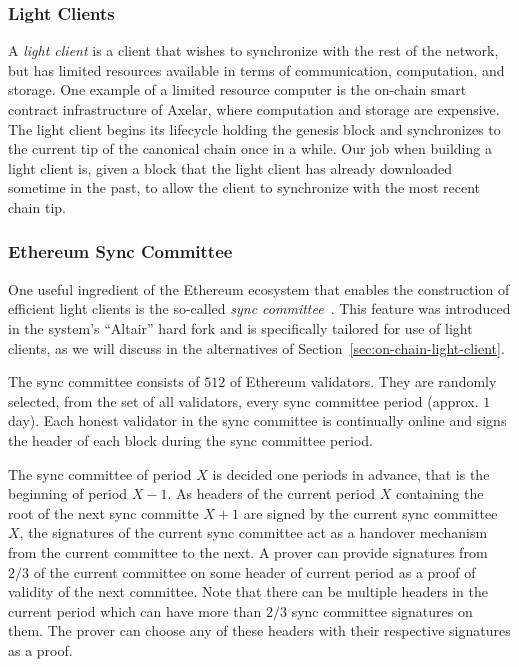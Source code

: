 \subsubsection{Light Clients}

A \emph{light client} is a client that wishes to synchronize with the rest
of the network, but has limited resources available in terms of communication,
computation, and storage. One example of a limited resource computer is the
on-chain smart contract infrastructure of Axelar, where computation and storage
are expensive. The light client begins its lifecycle holding the genesis block
and synchronizes to the current tip of the canonical chain once in a while.
Our job when building a light client is, given a block that the light client
has already downloaded sometime in the past, to allow the client to
synchronize with the most recent chain tip.

\subsubsection{Ethereum Sync Committee}\label{subsec:sync-committee}

One useful ingredient of the Ethereum ecosystem that enables the
construction of efficient light clients is the so-called \emph{sync committee}~\cite{sync-committee}.
This feature was introduced in the system's
``Altair'' hard fork and is specifically tailored for use of light clients, as
we will discuss in the alternatives of Section~\ref{sec:on-chain-light-client}.

The sync committee consists of $512$ of Ethereum validators. They are randomly
selected, from the set of all validators, every sync committee period (approx.
$1$ day). Each honest validator in the sync committee is continually online and
signs the header of each block during the sync committee period.

The sync committee of period $X$ is decided one periods in advance,
that is the beginning of period $X-1$. As headers of the current period $X$ 
containing the root of the next sync committe $X+1$ are signed by the current
sync committee $X$, the signatures of the current sync committee act as a 
handover mechanism from the current committee to the next. A prover can 
provide signatures from $2/3$ of the current committee on some header of 
current period as a proof of validity of the next committee. Note that there
can be multiple headers in the current period which can have more than $2/3$
sync committee signatures on them. The prover can choose any of these headers
with their respective signatures as a proof.


